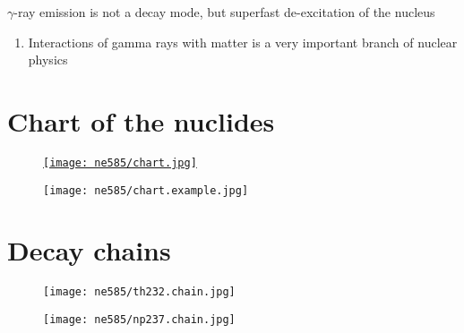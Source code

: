 \documentclass[aspectratio=1610,pdftex,dvipsnames,compress,xcolor={dvipsnames}]{beamer}
\begin{document}
\begin{frame}{$\gamma$-ray emission is not a decay mode, but superfast de-excitation of the nucleus}
    \begin{enumerate}[series=outerlist,topsep=0pt,itemsep=21pt,leftmargin=*,label=(\arabic*)]
        \item[]Interactions of gamma rays with matter is a very important branch of nuclear physics
    \end{enumerate}
\end{frame}


\section{Chart of the nuclides}


\addtocounter{framenumber}{-1}
\begin{frame}{}
    \begin{figure}
        \centering
        \href{https://www.nndc.bnl.gov/chart/}{\texttt{[image: ne585/chart.jpg]}}
    \end{figure}
\end{frame}


\begin{frame}{}
    \begin{figure}
        \centering
        \texttt{[image: ne585/chart.example.jpg]}
    \end{figure}
\end{frame}


\section{Decay chains}


\addtocounter{framenumber}{-1}
\begin{frame}{}
    \begin{figure}
        \centering
        \texttt{[image: ne585/th232.chain.jpg]}
    \end{figure}
\end{frame}


\begin{frame}{}
    \begin{figure}
        \centering
        \texttt{[image: ne585/np237.chain.jpg]}
    \end{figure}
\end{frame}
\end{document}
